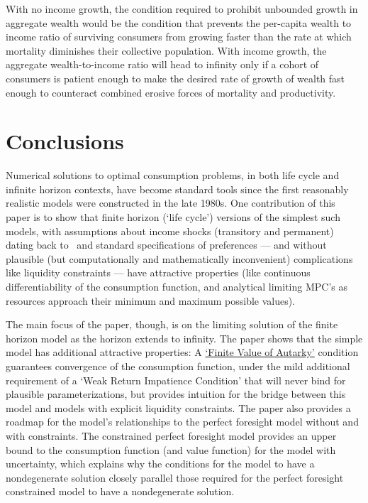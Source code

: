 \documentclass[BufferStockTheory]{subfiles}
\begin{document}
With no income growth, the condition required to prohibit unbounded growth in aggregate wealth would be the condition that prevents the per-capita wealth to income ratio of surviving consumers from growing faster than the rate at which mortality diminishes their collective population.  With income growth, the aggregate wealth-to-income ratio will head to infinity only if a cohort of consumers is patient enough to make the desired rate of growth of wealth fast enough to counteract combined erosive forces of mortality and productivity.


\hypertarget{Conclusions}{}
\section{Conclusions}

Numerical solutions to optimal consumption problems, in both life cycle and infinite horizon contexts, have become standard tools since the first reasonably realistic models were constructed in the late 1980s. One contribution of this paper is to show that finite horizon (`life cycle') versions of the simplest such models, with assumptions about income shocks (transitory and permanent) dating back to~\cite{friedmanATheory} and standard specifications of preferences --- and without plausible (but computationally and mathematically inconvenient) complications like liquidity constraints --- have attractive properties (like continuous differentiability of the consumption function, and analytical limiting MPC's as resources approach their minimum and maximum possible values).%

The main focus of the paper, though, is on the limiting solution of the finite horizon model as the horizon extends to infinity.  The paper shows that the simple model has additional attractive properties: A \href{https://econ-ark.github.io/BufferStockTheory#FVAC}{`Finite Value of Autarky'} condition guarantees convergence of the consumption function, under the mild additional requirement of a `Weak Return Impatience Condition' that will never bind for plausible parameterizations, but provides intuition for the bridge between this model and models with explicit liquidity constraints. The paper also provides a roadmap for the model's relationships to the perfect foresight model without and with constraints.  The constrained perfect foresight model provides an upper bound to the consumption function (and value function) for the model with uncertainty, which explains why the conditions for the model to have a nondegenerate solution closely parallel those required for the perfect foresight constrained model to have a nondegenerate solution.
\end{document}
